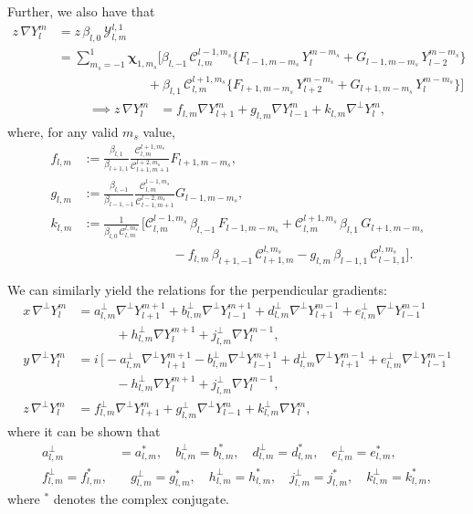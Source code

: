 \documentclass[11pt, oneside]{article}   	%
\newcommand{\gradY}{\nabla Y}
\newcommand{\gradYlm}{\nabla Y^m_l}
\newcommand{\gradpY}{\nabla^\perp Y}
\newcommand{\gradpYlm}{\nabla^\perp Y^m_l}
\newcommand{\curlyy}{\bm{\mathcal{Y}}}
\newcommand{\blone}{\beta_{l, 1}}
\newcommand{\blzero}{\beta_{l, 0}}
\newcommand{\blmone}{\beta_{l, -1}}
\newcommand{\chivec}{\bm{\chi}_{1,m_s}}
\newcommand{\cgcoeff}{\mathcal{C}}
\newcommand{\alm}{a_{l,m}}
\newcommand{\blm}{b_{l,m}}
\newcommand{\dlm}{d_{l,m}}
\newcommand{\elm}{e_{l,m}}
\newcommand{\flm}{f_{l,m}}
\newcommand{\glm}{g_{l,m}}
\newcommand{\hlm}{h_{l,m}}
\newcommand{\jlm}{j_{l,m}}
\newcommand{\klm}{k_{l,m}}
\newcommand{\almperp}{a_{l,m}^\perp}
\newcommand{\blmperp}{b_{l,m}^\perp}
\newcommand{\dlmperp}{d_{l,m}^\perp}
\newcommand{\elmperp}{e_{l,m}^\perp}
\newcommand{\flmperp}{f_{l,m}^\perp}
\newcommand{\glmperp}{g_{l,m}^\perp}
\newcommand{\hlmperp}{h_{l,m}^\perp}
\newcommand{\jlmperp}{j_{l,m}^\perp}
\newcommand{\klmperp}{k_{l,m}^\perp}
\begin{document}
Further, we also have that
\begin{align}
z \,\gradYlm 
&= z \, \blzero \, \curlyy^{l,1}_{l,m} \nonumber
\\
&= \sum_{m_s=-1}^{1} \chivec \Big[ \blmone \, \cgcoeff^{l-1,m_s}_{l,m} \big\{ F_{l-1,m-m_s} \, Y^{m-m_s}_{l} + G_{l-1,m-m_s} \, Y^{m-m_s}_{l-2} \big\} \nonumber \\ 
& \quad \quad \quad \quad \quad \quad \quad + \blone \, \cgcoeff^{l+1,m_s}_{l,m} \big\{ F_{l+1,m-m_s} \, Y^{m-m_s}_{l+2} + G_{l+1,m-m_s} \, Y^{m-m_s}_{l} \big\} \Big]
\end{align}
\begin{align}
\implies z \,\gradYlm &= \flm \gradY^{m}_{l+1} + \glm \gradY^{m}_{l-1} + \klm \gradpY^{m}_{l},
\end{align}
where, for any valid \(m_s\) value,
\begin{align}
\flm &:= \frac{\blone}{\beta_{l+1,1}} \frac{\cgcoeff^{l+1,m_s}_{l,m}}{\cgcoeff^{l+2,m_s}_{l+1,m+1}} F_{l+1,m-m_s}, \\
\glm &:= \frac{\blmone}{\beta_{l-1,-1}} \frac{\cgcoeff^{l-1,m_s}_{l,m}}{\cgcoeff^{l-2,m_s}_{l-1,m+1}} G_{l-1,m-m_s}, \\
\klm &:= \frac{1}{\blzero \, \cgcoeff^{l,m_s}_{l, m}} \, \Big[ \cgcoeff^{l-1,m_s}_{l,m} \, \blmone \, F_{l-1,m-m_s} + \cgcoeff^{l+1,m_s}_{l,m} \, \blone \, G_{l+1,m-m_s}  \nonumber \\
& \quad \quad \quad \quad \quad \quad \quad - \flm \, \beta_{l+1,-1} \, \cgcoeff^{l,m_s}_{l+1,m} - \glm \, \beta_{l-1,1} \, \cgcoeff^{l,m_s}_{l-1,1} \Big].
\end{align}

We can similarly yield the relations for the perpendicular gradients:
\begin{align}
x \,\gradpYlm &= \almperp \gradpY^{m+1}_{l+1} + \blmperp \gradpY^{m+1}_{l-1} + \dlmperp \gradpY^{m-1}_{l+1} + \elmperp \gradpY^{m-1}_{l-1} \nonumber \\
& \quad \quad \quad + \hlmperp \gradY^{m+1}_{l} + \jlmperp \gradY^{m-1}_{l}, \\
y \,\gradpYlm &= i \, \Big[ -\almperp \gradpY^{m+1}_{l+1} - \blmperp \gradpY^{m+1}_{l-1} + \dlmperp \gradpY^{m-1}_{l+1} + \elmperp \gradpY^{m-1}_{l-1} \nonumber \\
& \quad \quad \quad - \hlmperp \gradY^{m+1}_{l} + \jlmperp \gradY^{m-1}_{l}, \\
z \,\gradpYlm &= \flmperp \gradpY^{m}_{l+1} + \glmperp \gradpY^{m}_{l-1} + \klmperp \gradY^{m}_{l},
\end{align}
where it can be shown that
\begin{align}
\almperp &= \alm^*, \quad \blmperp = \blm^*, \quad \dlmperp = \dlm^*, \quad \elmperp = \elm^*, \nonumber \\
\flmperp = \flm^*,& \quad \glmperp = \glm^*, \quad \hlmperp = \hlm^*, \quad \jlmperp = \jlm^*, \quad \klmperp = \klm^*,
\end{align}
where \(^*\) denotes the complex conjugate.
\end{document}
